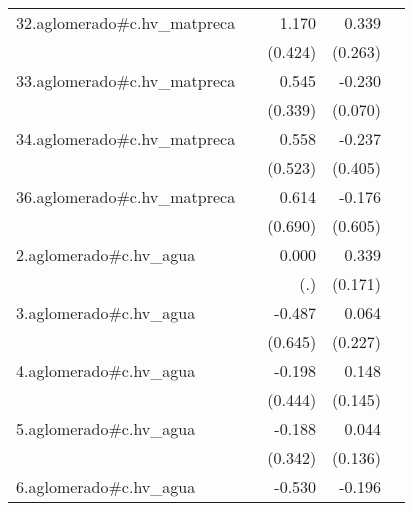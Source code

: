 {\begin{longtable}{l*{4}{D{.}{.}{-1}}}
\addlinespace
32.aglomerado#c.hv\_matpreca&                     &       1.170\sym{**} &       0.339         &                     \\
            &                     &     (0.424)         &     (0.263)         &                     \\
\addlinespace
33.aglomerado#c.hv\_matpreca&                     &       0.545         &      -0.230\sym{***}&                     \\
            &                     &     (0.339)         &     (0.070)         &                     \\
\addlinespace
34.aglomerado#c.hv\_matpreca&                     &       0.558         &      -0.237         &                     \\
            &                     &     (0.523)         &     (0.405)         &                     \\
\addlinespace
36.aglomerado#c.hv\_matpreca&                     &       0.614         &      -0.176         &                     \\
            &                     &     (0.690)         &     (0.605)         &                     \\
\addlinespace
2.aglomerado#c.hv\_agua&                     &       0.000         &       0.339\sym{*}  &                     \\
            &                     &         (.)         &     (0.171)         &                     \\
\addlinespace
3.aglomerado#c.hv\_agua&                     &      -0.487         &       0.064         &                     \\
            &                     &     (0.645)         &     (0.227)         &                     \\
\addlinespace
4.aglomerado#c.hv\_agua&                     &      -0.198         &       0.148         &                     \\
            &                     &     (0.444)         &     (0.145)         &                     \\
\addlinespace
5.aglomerado#c.hv\_agua&                     &      -0.188         &       0.044         &                     \\
            &                     &     (0.342)         &     (0.136)         &                     \\
\addlinespace
6.aglomerado#c.hv\_agua&                     &      -0.530         &      -0.196         &                     \\

\end{longtable}}
